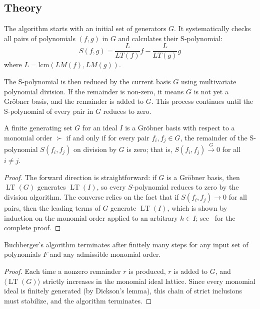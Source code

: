 \subsection{Theory}
\label{subsec:buchberger_theory}

The algorithm starts with an initial set of generators $G$. It systematically checks all pairs of polynomials $(f, g)$ in $G$ and calculates their S-polynomial:
$$S(f, g) = \frac{L}{LT(f)} f - \frac{L}{LT(g)} g$$
where $L = \text{lcm}(LM(f), LM(g))$.

The S-polynomial is then reduced by the current basis $G$ using multivariate polynomial division. If the remainder is non-zero, it means $G$ is not yet a Gr\"obner basis, and the remainder is added to $G$. This process continues until the S-polynomial of every pair in $G$ reduces to zero.

\begin{theorem}\label{thm:buchberger_criterion}
A finite generating set $G$ for an ideal $I$ is a Gr\"obner basis with respect to a monomial order $\succ$ if and only if for every pair $f_i, f_j \in G$, the remainder of the S-polynomial $S(f_i, f_j)$ on division by $G$ is zero; that is, $S(f_i, f_j) \xrightarrow{G} 0$ for all $i \neq j$.
\end{theorem}

\begin{proof}
The forward direction is straightforward: if $G$ is a Gr\"obner basis, then $\operatorname{LT}(G)$ generates $\operatorname{LT}(I)$, so every $S$-polynomial reduces to zero by the division algorithm. The converse relies on the fact that if $S(f_i, f_j) \to 0$ for all pairs, then the leading terms of $G$ generate $\operatorname{LT}(I)$, which is shown by induction on the monomial order applied to an arbitrary $h \in I$; see~\cite[Chapter~2]{cox2007} for the complete proof.
\end{proof}

\begin{theorem}\label{thm:buchberger_termination}
Buchberger's algorithm terminates after finitely many steps for any input set of polynomials $F$ and any admissible monomial order.
\end{theorem}

\begin{proof}
Each time a nonzero remainder $r$ is produced, $r$ is added to $G$, and $\langle \operatorname{LT}(G) \rangle$ strictly increases in the monomial ideal lattice. Since every monomial ideal is finitely generated (by Dickson's lemma), this chain of strict inclusions must stabilize, and the algorithm terminates.
\end{proof}

